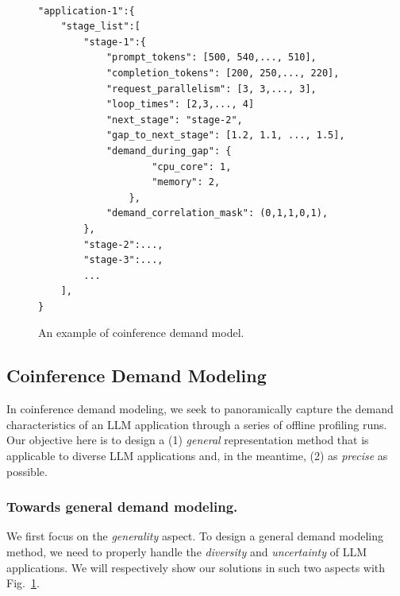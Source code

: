 \begin{figure}
    \centering
    \begin{verbatim}

"application-1":{
    "stage_list":[
        "stage-1":{
            "prompt_tokens": [500, 540,..., 510],
            "completion_tokens": [200, 250,..., 220],
            "request_parallelism": [3, 3,..., 3],
            "loop_times": [2,3,..., 4]
            "next_stage": "stage-2",
            "gap_to_next_stage": [1.2, 1.1, ..., 1.5],
            "demand_during_gap": {
                    "cpu_core": 1,
                    "memory": 2,
                },
            "demand_correlation_mask": (0,1,1,0,1),
        },
        "stage-2":...,
        "stage-3":...,
        ...
    ],
}

    \end{verbatim}
    \vspace{-0.3cm}
    \caption{An example of coinference demand model.} 
    \label{fig:demand_model}
\end{figure}


\subsection{Coinference Demand Modeling}
\label{subsec:demand_modeling}

In coinference demand modeling, we seek to panoramically capture the demand characteristics of an LLM application through a series of offline profiling runs. 
Our objective  here is to design a (1) \emph{general} representation method that is applicable to diverse LLM applications and, in the meantime, (2) as \emph{precise} as possible. 

\subsubsection{Towards general demand modeling.}
We first focus on the \emph{generality} aspect. 
To design a general demand modeling method, we need to properly handle the \emph{diversity} and \emph{uncertainty} of LLM applications. 
We will respectively show our solutions in such two aspects with Fig.~\ref{fig:demand_model}.


